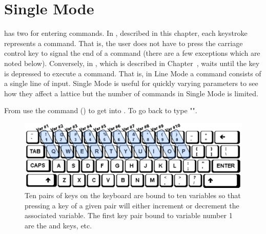 
\chapter{Single Mode}
\label{c:single}

\tao has two  for entering commands. In , described in this chapter, each
keystroke represents a command.  That is, the user does not have to press the carriage control key
to signal the end of a command (there are a few exceptions which are noted below). Conversely, in
, which is described in Chapter~, \tao waits until the  key
is depressed to execute a command. That is, in Line Mode a command consists of a single line of
input.  Single Mode is useful for quickly varying parameters to see how they affect a lattice but
the number of commands in Single Mode is limited.

From  use the  command () to get into . To go back to  type "".

\begin{figure}
  \centering
  \includegraphics[width=5in]{keyboard.pdf}
  \caption[Bindings of key pairs on the keyboard to variables.]
{Ten pairs of keys on the keyboard are bound to ten variables so that pressing a key of a given pair
will either increment or decrement the associated variable. The first key pair bound to variable
number 1 are the  and  keys, etc.}
  \label{f:keyboard}
\end{figure}

